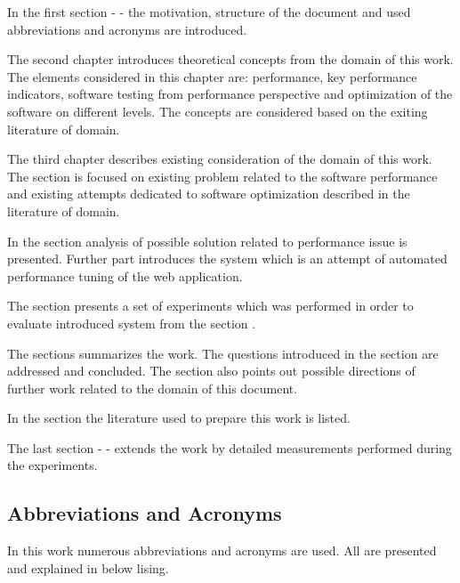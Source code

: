 \documentclass[12pt,a4paper]{article}
\begin{document}
In the first section - \textit{} - the motivation, structure of the document and used abbreviations and acronyms are introduced. 

The second chapter \textit{} introduces theoretical concepts from the domain of this work. The elements considered in this chapter are: performance, key performance indicators, software testing from performance perspective and optimization of the software on different levels. The concepts are considered based on the exiting literature of domain. 
  
The third chapter \textit{} describes existing consideration of the domain of this work. The section is focused on existing problem related to the software performance and existing attempts    dedicated to software optimization described in the literature of domain.

In the section \textit{} analysis of possible solution related to performance issue is presented. Further part introduces the system which is an attempt of automated performance tuning of the web application.

The section \textit{} presents a set of experiments which was performed in order to evaluate introduced system from the section \textit{}. 

The \textit{} sections summarizes the work. The questions introduced in the section \textit{} are addressed and concluded. The section also points out possible directions of further work related to the domain of this document. 

In the section \textit{} the literature used to prepare this work is listed.

The last section - \textit{} - extends the work by detailed measurements performed during the experiments. 

\pagebreak
\subsection{Abbreviations and Acronyms}
In this work numerous abbreviations and acronyms are used. All are presented and explained in below lising.
\end{document}
